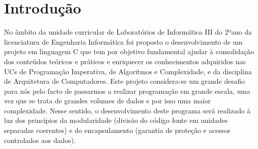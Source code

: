 \chapter{Introdução}


No âmbito da unidade curricular de Laboratórios de Informática III do 2ºano da licenciatura de Engenharia Informática foi proposto o desenvolvimento de um projeto em linguagem C que tem por objetivo fundamental ajudar à consolidação dos conteúdos teóricos e práticos e enriquecer os conhecimentos adquiridos nas UCs de Programação Imperativa, de Algoritmos e Complexidade, e da disciplina de Arquitetura de Computadores.
Este projeto considera-se um grande desafio para nós pelo facto de passarmos a realizar programação em grande escala, uma vez que se trata de grandes volumes de dados e por isso uma maior complexidade.
Nesse sentido, o desenvolvimento deste programa será realizado à luz dos princípios da modularidade (divisão do código fonte em unidades separadas coerentes) e do encapsulamento (garantia de proteção e acessos controlados aos dados). 
